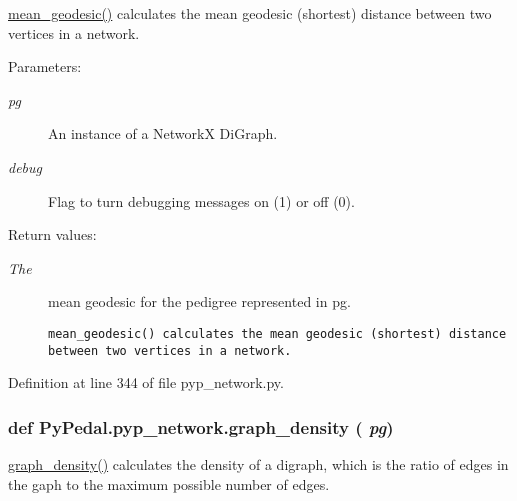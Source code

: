 \hyperlink{namespacePyPedal_1_1pyp__network_7c69193d5911cfb1deb21a6bd45a9423}{mean\_\-geodesic()} calculates the mean geodesic (shortest) distance between two vertices in a network. 

\begin{Desc}
\item[Parameters:]
\begin{description}
\item[{\em pg}]An instance of a Network\-X Di\-Graph. \item[{\em debug}]Flag to turn debugging messages on (1) or off (0). \end{description}
\end{Desc}
\begin{Desc}
\item[Return values:]
\begin{description}
\item[{\em The}]mean geodesic for the pedigree represented in pg.

\footnotesize\begin{verbatim}mean_geodesic() calculates the mean geodesic (shortest) distance
between two vertices in a network.
\end{verbatim}
\normalsize
 \end{description}
\end{Desc}


Definition at line 344 of file pyp\_\-network.py.\hypertarget{namespacePyPedal_1_1pyp__network_5f7dd88164c3ad27f54fa8905494a02a}{
\subsubsection[graph\_\-density]{\setlength{\rightskip}{0pt plus 5cm}def Py\-Pedal.pyp\_\-network.graph\_\-density ( {\em pg})}}
\label{namespacePyPedal_1_1pyp__network_5f7dd88164c3ad27f54fa8905494a02a}


\hyperlink{namespacePyPedal_1_1pyp__network_5f7dd88164c3ad27f54fa8905494a02a}{graph\_\-density()} calculates the density of a digraph, which is the ratio of edges in the gaph to the maximum possible number of edges. 

